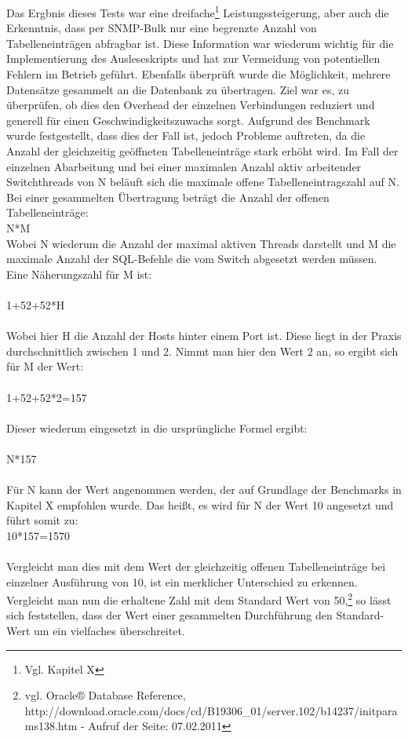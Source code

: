 Das Ergbnis dieses Tests war eine dreifache\footnote{Vgl. Kapitel X} Leistungssteigerung, aber auch die Erkenntnis, dass per SNMP-Bulk nur eine begrenzte Anzahl von Tabelleneinträgen abfragbar ist. Diese Information war wiederum wichtig für die Implementierung des Ausleseskripts und hat zur Vermeidung von potentiellen Fehlern im Betrieb geführt. Ebenfalls überprüft wurde die Möglichkeit, mehrere Datensätze gesammelt an die Datenbank zu übertragen.
Ziel war es, zu überprüfen, ob dies den Overhead der einzelnen Verbindungen reduziert und generell für einen Geschwindigkeitszuwachs sorgt. Aufgrund des Benchmark wurde festgestellt, dass dies der Fall ist, jedoch Probleme auftreten, da die Anzahl der gleichzeitig geöffneten Tabelleneinträge stark erhöht wird. Im Fall der einzelnen Abarbeitung und bei einer maximalen Anzahl aktiv arbeitender Switchthreads von N beläuft sich die maximale offene Tabelleneintragszahl auf N.
\\ Bei einer gesammelten Übertragung beträgt die Anzahl der offenen Tabelleneinträge:\\
N*M\\
Wobei N wiederum die Anzahl der maximal aktiven Threads darstellt und M die maximale Anzahl der SQL-Befehle die vom Switch abgesetzt werden müssen. Eine Näherungszahl für M ist:\\
\\
1+52+52*H\\
\\
Wobei hier H die Anzahl der Hosts hinter einem Port ist. Diese liegt in der Praxis durchschnittlich zwischen 1 und 2. Nimmt man hier den Wert 2 an, so ergibt sich für M der Wert:\\
\\
1+52+52*2=157\\
\\
Dieser wiederum eingesetzt in die ursprüngliche Formel ergibt:\\
\\
N*157\\
\\
Für N kann der Wert angenommen werden, der auf Grundlage der Benchmarks in Kapitel X empfohlen wurde.
Das heißt, es wird für N der Wert 10 angesetzt und führt somit zu:
\\
10*157=1570\\
\\
Vergleicht man dies mit dem Wert der gleichzeitig offenen Tabelleneinträge bei einzelner Ausführung von 10, ist ein merklicher Unterschied zu erkennen. Vergleicht man nun die erhaltene Zahl mit dem Standard Wert von 50,\footnote{vgl. Oracle® Database Reference, http://download.oracle.com/docs/cd/B19306\_01/server.102/b14237/initparams138.htm - Aufruf der Seite: 07.02.2011} so lässt sich feststellen, dass der Wert einer gesammelten Durchführung den Standard-Wert um ein vielfaches überschreitet.
